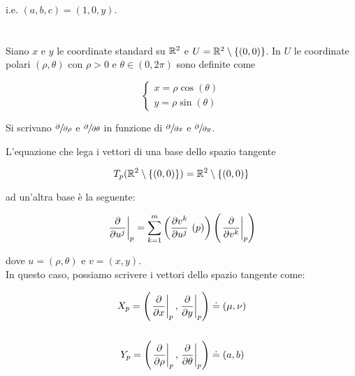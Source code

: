 i.e. $ (a,b,c) = (1,0,y) $.

\tocless\section{}\label{es2-9}

\begin{tcolorbox}
	Siano $ x $ e $ y $ le coordinate standard su $ \mathbb{R}^{2} $ e $ U = \mathbb{R}^{2} \setminus \{(0,0)\} $. In $ U $ le coordinate polari $ (\rho, \theta) $ con $ \rho > 0 $ e $ \theta \in (0,2\pi) $ sono definite come
	
	\begin{equation}
		\begin{cases}
			x = \rho \cos(\theta)\\
			y = \rho \sin(\theta)
		\end{cases}
	\end{equation}
	
	Si scrivano $ \sfrac{\partial}{\partial \rho} $ e $ \sfrac{\partial}{\partial \theta} $ in funzione di $ \sfrac{\partial}{\partial x} $ e $ \sfrac{\partial}{\partial y} $.
\end{tcolorbox}

L'equazione che lega i vettori di una base dello spazio tangente

\begin{equation}
	T_{p}(\mathbb{R}^{2} \setminus \{(0,0)\}) = \mathbb{R}^{2} \setminus \{(0,0)\}
\end{equation}

ad un'altra base è la seguente:

\begin{equation}
	\eval{\pdv{u^{j}}}_{p} = \sum_{k=1}^{m} \left( \pdv{v^{k}}{u^{j}}\ (p) \right) \left( \eval{\pdv{v^{k}}}_{p} \right)
\end{equation}

dove $ u = (\rho,\theta) $ e $ v = (x,y) $.\\
In questo caso, possiamo scrivere i vettori dello spazio tangente come:

\begin{align}
	\begin{split}
		X_{p} = \left( \eval{\pdv{x}}_{p}, \eval{\pdv{y}}_{p} \right) &\doteq (\mu,\nu)\\\\
		Y_{p} = \left( \eval{\pdv{\rho}}_{p}, \eval{\pdv{\theta}}_{p} \right) &\doteq (a,b)
	\end{split}
\end{align}

